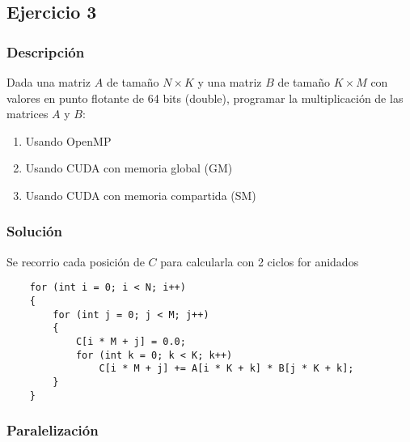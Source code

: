 \documentclass[letterpaper]{article}
\theoremstyle{definition}
\theoremstyle{lemathm}
\theoremstyle{lemathm}
\theoremstyle{lemathm}
\theoremstyle{lemademthm}
\newcommand{\1}{\mathbbm{1}}
\begin{document}
	\newpage

	\subsection*{Ejercicio 3}

	\subsubsection*{Descripción}

	Dada una matriz $A$ de tamaño $N\times K$ y una matriz $B$ de tamaño $K\times M$ con valores en punto flotante de 64 bits (double), programar la multiplicación de las matrices $A$ y $B$:

	\begin{enumerate}
		\item Usando OpenMP
		\item Usando CUDA con memoria global (GM)
		\item Usando CUDA con memoria compartida (SM)
	\end{enumerate}

	\subsubsection*{Solución}

	Se recorrio cada posición de $C$ para calcularla con 2 ciclos for anidados
	
	\begin{verbatim}
	for (int i = 0; i < N; i++)
    {
        for (int j = 0; j < M; j++)
        {
            C[i * M + j] = 0.0;
            for (int k = 0; k < K; k++)
                C[i * M + j] += A[i * K + k] * B[j * K + k];
        }
    }
	\end{verbatim}

	\subsubsection*{Paralelización}
\end{document}

